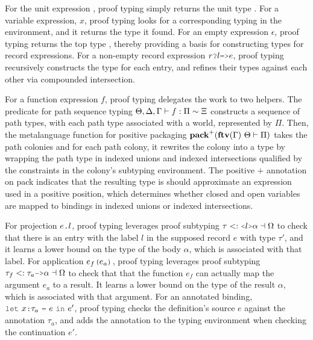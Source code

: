 \documentclass[acmsmall]{acmart}
\theoremstyle{definition}
\begin{document}
\noindent
For the unit expression , proof typing simply returns the unit type . 
For a variable expression, $x$, proof typing looks for a corresponding typing in the environment, 
and it returns the type it found.
For an empty expression $\epsilon$, proof typing returns the top type ,
thereby providing a basis for constructing types for record expressions. 
For a non-empty record expression $r\J{?}l\J{=>}e$, proof typing 
recursively constructs the type for each entry, and
refines their types against each other via compounded intersection.

For a function expression $f$, proof typing 
delegates the work to two helpers. 
The predicate for path sequence typing 
$\Theta, \Delta, \Gamma \vdash f : \Pi \sim \Xi$
constructs a sequence of path types, 
with each path type associated with a world, represented by $\Pi$.
Then, the metalanguage function for positive packaging 
$\textbf{pack}^+(\textbf{ftv}(\Gamma)\ \Theta \vdash \Pi)$
takes the path colonies and for each path colony,
it rewrites the colony into a type by wrapping the path type in indexed unions
and indexed intersections qualified by the constraints in the colony's subtyping environment. 
The positive $+$ annotation on pack indicates that the resulting type 
is should approximate an expression used in a positive position,
which determines whether closed and open variables are mapped to
bindings in indexed unions or indexed intersections.

For projection $e\J{.}l$, proof typing
leverages proof subtyping $\tau \subtypes \J{<}l\J{>}\alpha \given \Omega$ 
to check that there is an entry with the label $l$ 
in the supposed record $e$ with type $\tau'$, 
and it learns a lower bound 
on the type of the body $\alpha$, which is associated with that label.
For application $e_f\J{(}e_a\J{)}$, proof typing
leverages proof subtyping $\tau_f \subtypes \tau_a \J{->} \alpha \given \Omega$
to check that that the function $e_f$ can actually
map the argument $e_a$ to a result. It learns a lower bound 
on the type of the result $\alpha$, which is associated with that argument.
For an annotated binding, $\J{let}\ x \J{:} \tau_a\ \J{=}\ e\ \J{in}\ e'$, 
proof typing checks the definition's source $e$ against the annotation $\tau_a$,
and adds the annotation to the typing environment when checking the continuation $e'$.
\end{document}
